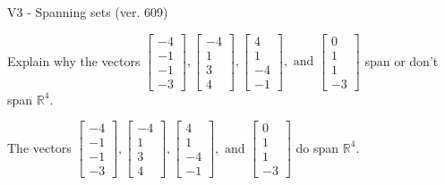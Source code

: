 \begin{exercise}
  \begin{exerciseTitle}V3 - Spanning sets (ver. 609)\end{exerciseTitle}
  \begin{exerciseStatement}
    Explain why the vectors \(\left[\begin{array}{r}
-4 \\
-1 \\
-1 \\
-3
\end{array}\right] , \left[\begin{array}{r}
-4 \\
1 \\
3 \\
4
\end{array}\right] , \left[\begin{array}{r}
4 \\
1 \\
-4 \\
-1
\end{array}\right] , \text{ and } \left[\begin{array}{r}
0 \\
1 \\
1 \\
-3
\end{array}\right]\) span or don't span \(\mathbb{R}^4\). 
	


  \end{exerciseStatement}
  \begin{exerciseAnswer}
   The vectors \(\left[\begin{array}{r}
-4 \\
-1 \\
-1 \\
-3
\end{array}\right] , \left[\begin{array}{r}
-4 \\
1 \\
3 \\
4
\end{array}\right] , \left[\begin{array}{r}
4 \\
1 \\
-4 \\
-1
\end{array}\right] , \text{ and } \left[\begin{array}{r}
0 \\
1 \\
1 \\
-3
\end{array}\right]\) 
  	 do  
	span \(\mathbb{R}^4\).
  


  \end{exerciseAnswer}
\end{exercise}